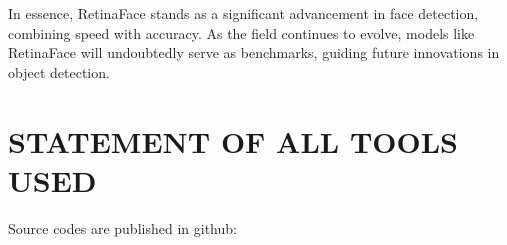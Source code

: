 \documentclass{article}
\begin{document}
In essence, RetinaFace stands as a significant advancement in face detection, combining speed with accuracy. As the field continues to evolve, models like RetinaFace will undoubtedly serve as benchmarks, guiding future innovations in object detection.


\section{STATEMENT OF ALL TOOLS USED}
\label{sec:statementofalltoolsused}


Source codes are published in github: 





\vfill\pagebreak



\end{document}
